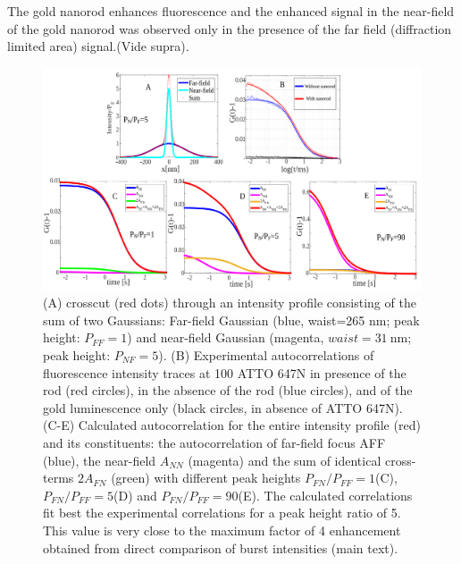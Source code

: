 The gold nanorod enhances fluorescence and the enhanced signal in the near-field of the gold nanorod was observed only in the presence of the far field (diffraction limited area) signal.(Vide supra).
\begin{figure}%
  \centering
  \includegraphics[width=\textwidth]{calc_enhc_corr}
  \makeatletter
  \renewcommand{\fnum@figure}{\figurename~S\thefigure}
  \makeatother{}
  \caption{ (A) crosscut (red dots) through an intensity profile consisting of the sum of two Gaussians: Far-field Gaussian (blue, waist=265 nm; peak height: $P_{FF}=1$) and near-field Gaussian (magenta, $waist=\SI{31}{\nm}$; peak height: $P_{NF}=5$).
  (B) Experimental autocorrelations of fluorescence intensity traces at \SI{100}{\nM} ATTO 647N in presence of the rod (red circles), in the absence of the rod (blue circles), and of the gold luminescence only (black circles, in absence of ATTO 647N).
  (C-E) Calculated autocorrelation for the entire intensity profile (red) and its constituents: the autocorrelation of far-field focus AFF (blue), the near-field $A_{NN}$ (magenta) and the 
  sum of identical cross-terms $2A_{FN}$ (green) with different peak heights $P_{FN}/P_{FF}=1$(C), $P_{FN}/P_{FF}=5$(D) and $P_{FN}/P_{FF}=90$(E).
  The calculated correlations fit best the experimental correlations for a peak height ratio of 5.
  This value is very close to the maximum factor of 4 enhancement obtained from direct comparison of burst intensities (main text).}
  \label{SIfig:calc_enhc_corr}
\end{figure}

